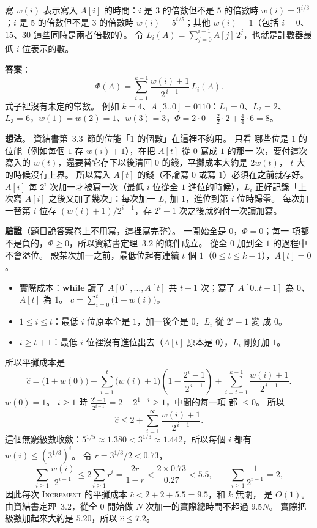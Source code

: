 \begin{pastsoln}
寫 $w(i)$ 表示寫入 $A[i]$ 的時間：$i$ 是 $3$ 的倍數但不是 $5$ 的倍數時
$w(i) = 3^{i/3}$；$i$ 是 $5$ 的倍數但不是 $3$ 的倍數時 $w(i) = 5^{i/5}$；其他
$w(i) = 1$（包括 $i = 0$、$15$、$30$ 這些同時是兩者倍數的）。 令
$L_i(A) = \sum_{j=0}^{i-1} A[j]\, 2^j$，也就是計數器最低 $i$ 位表示的數。

\textbf{答案}：
\[
\Phi(A) = \sum_{i=1}^{k-1} \frac{w(i) + 1}{2^{\,i-1}} \, L_i(A) .
\]
式子裡沒有未定的常數。 例如 $k = 4$、$A[3..0] = 0110$：$L_1 = 0$、$L_2 = 2$、
$L_3 = 6$，$w(1) = w(2) = 1$、$w(3) = 3$，$\Phi = 2 \cdot 0 + \frac{2}{2} \cdot 2 +
\frac{4}{4} \cdot 6 = 8$。

\textbf{想法}。 資結書第~3.3~節的位能「$1$ 的個數」在這裡不夠用。 只看
哪些位是 $1$ 的位能（例如每個 $1$ 存 $w(i) + 1$），在把 $A[t]$ 從 $0$ 寫成 $1$ 的那一
次，要付這次寫入的 $w(t)$，還要替它存下以後清回 $0$ 的錢，平攤成本大約是 $2w(t)$，
$t$ 大的時候沒有上界。 所以寫入 $A[t]$ 的錢（不論寫 $0$ 或寫
$1$）必須在\textbf{之前}就存好。 $A[i]$ 每 $2^i$ 次加一才被寫一次（最低 $i$ 位從全
$1$ 進位的時候），$L_i$ 正好記錄「上次寫 $A[i]$ 之後又加了幾次」：每次加一 $L_i$ 加
$1$，進位到第 $i$ 位時歸零。 每次加一替第 $i$ 位存 $(w(i) + 1)/2^{i-1}$，存 $2^i - 1$
次之後就夠付一次讀加寫。

\textbf{驗證}（題目說答案卷上不用寫，這裡寫完整）。 一開始全是 $0$，$\Phi = 0$；每一
項都不是負的，$\Phi \ge 0$，所以資結書定理~3.2 的條件成立。 從全 $0$ 加到全
$1$ 的過程中不會溢位。 設某次加一之前，最低位起有連續 $t$ 個 $1$（$0 \le t \le k -
1$），$A[t] = 0$。
\begin{itemize}
\item 實際成本：\textbf{while} 讀了 $A[0], \ldots, A[t]$ 共 $t + 1$ 次；寫了
$A[0..t-1]$ 為 $0$、$A[t]$ 為 $1$。 $c = \sum_{i=0}^{t} \bigl(1 + w(i)\bigr)$。
\item $1 \le i \le t$：最低 $i$ 位原本全是 $1$，加一後全是 $0$，$L_i$ 從 $2^i - 1$ 變
成 $0$。
\item $i \ge t + 1$：最低 $i$ 位裡沒有進位出去（$A[t]$ 原本是 $0$），$L_i$ 剛好加 $1$。
\end{itemize}
所以平攤成本是
\[
\hat{c} = \bigl(1 + w(0)\bigr)
+ \sum_{i=1}^{t} \bigl(w(i) + 1\bigr)\left(1 - \frac{2^i - 1}{2^{\,i-1}}\right)
+ \sum_{i=t+1}^{k-1} \frac{w(i) + 1}{2^{\,i-1}} .
\]
$w(0) = 1$。 $i \ge 1$ 時 $\frac{2^i - 1}{2^{i-1}} = 2 - 2^{1-i} \ge 1$，中間的每一項
都 $\le 0$。 所以
\[
\hat{c} \le 2 + \sum_{i=1}^{\infty} \frac{w(i) + 1}{2^{\,i-1}} .
\]
這個無窮級數收斂：$5^{1/5} \approx 1.380 < 3^{1/3} \approx 1.442$，所以每個 $i$ 都有
$w(i) \le (3^{1/3})^i$。 令 $r = 3^{1/3}/2 < 0.73$，
\[
\sum_{i \ge 1} \frac{w(i)}{2^{i-1}} \le 2 \sum_{i \ge 1} r^i = \frac{2r}{1 - r}
< \frac{2 \times 0.73}{0.27} < 5.5, \qquad \sum_{i \ge 1} \frac{1}{2^{i-1}} = 2 ,
\]
因此每次 \textsc{Increment} 的平攤成本 $\hat{c} < 2 + 2 + 5.5 = 9.5$，和 $k$ 無關，
是 $O(1)$。 由資結書定理~3.2，從全 $0$ 開始做 $N$ 次加一的實際總時間不超過
$9.5N$。 實際把級數加起來大約是 $5.20$，所以 $\hat{c} \le 7.2$。
\end{pastsoln}
